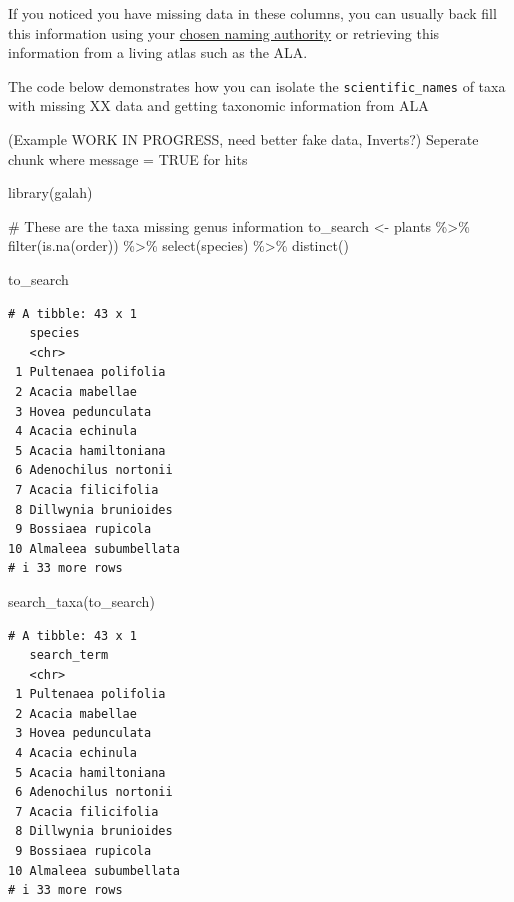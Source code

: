 \documentclass[
  letterpaper,
  DIV=11,
  numbers=noendperiod,
  oneside]{scrreprt}
\newenvironment{Shaded}{\begin{snugshade}}{\end{snugshade}}
\newcommand{\CommentTok}[1]{\textcolor[rgb]{0.37,0.37,0.37}{#1}}
\newcommand{\FunctionTok}[1]{\textcolor[rgb]{0.28,0.35,0.67}{#1}}
\newcommand{\NormalTok}[1]{\textcolor[rgb]{0.00,0.23,0.31}{#1}}
\newcommand{\OtherTok}[1]{\textcolor[rgb]{0.00,0.23,0.31}{#1}}
\newcommand{\SpecialCharTok}[1]{\textcolor[rgb]{0.37,0.37,0.37}{#1}}
\begin{document}
If you noticed you have missing data in these columns, you can usually
back fill this information using your
\href{link\%20back\%20to\%20section}{chosen naming authority} or
retrieving this information from a living atlas such as the ALA.

The code below demonstrates how you can isolate the
\texttt{scientific\_names} of taxa with missing XX data and getting
taxonomic information from ALA

(Example WORK IN PROGRESS, need better fake data, Inverts?) Seperate
chunk where message = TRUE for hits

\begin{Shaded}
\begin{Highlighting}[]
\FunctionTok{library}\NormalTok{(galah)}

\CommentTok{\# These are the taxa missing \textasciigrave{}genus\textasciigrave{} information}
\NormalTok{to\_search }\OtherTok{\textless{}{-}}\NormalTok{ plants }\SpecialCharTok{\%\textgreater{}\%} 
  \FunctionTok{filter}\NormalTok{(}\FunctionTok{is.na}\NormalTok{(order)) }\SpecialCharTok{\%\textgreater{}\%} 
  \FunctionTok{select}\NormalTok{(species) }\SpecialCharTok{\%\textgreater{}\%} 
  \FunctionTok{distinct}\NormalTok{()}

\NormalTok{to\_search}
\end{Highlighting}
\end{Shaded}

\begin{verbatim}
# A tibble: 43 x 1
   species              
   <chr>                
 1 Pultenaea polifolia  
 2 Acacia mabellae      
 3 Hovea pedunculata    
 4 Acacia echinula      
 5 Acacia hamiltoniana  
 6 Adenochilus nortonii 
 7 Acacia filicifolia   
 8 Dillwynia brunioides 
 9 Bossiaea rupicola    
10 Almaleea subumbellata
# i 33 more rows
\end{verbatim}

\begin{Shaded}
\begin{Highlighting}[]
\FunctionTok{search\_taxa}\NormalTok{(to\_search)}
\end{Highlighting}
\end{Shaded}

\begin{verbatim}
# A tibble: 43 x 1
   search_term          
   <chr>                
 1 Pultenaea polifolia  
 2 Acacia mabellae      
 3 Hovea pedunculata    
 4 Acacia echinula      
 5 Acacia hamiltoniana  
 6 Adenochilus nortonii 
 7 Acacia filicifolia   
 8 Dillwynia brunioides 
 9 Bossiaea rupicola    
10 Almaleea subumbellata
# i 33 more rows
\end{verbatim}
\end{document}
